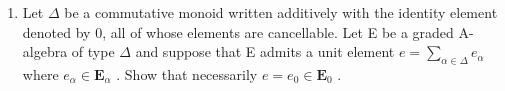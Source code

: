 \BourbakiExercisesSection

\begin{enumerate}
\def\labelenumi{\arabic{enumi}.}
\tightlist
\item
  Let \(\Delta\) be a commutative monoid written additively with the identity element denoted by 0, all of whose elements are cancellable. Let E be a graded A-algebra of type \(\Delta\) and suppose that E admits a unit element \(e = \sum_{\alpha \in \Delta} e_{\alpha}\) where \(e_{\alpha} \in \mathbf{E}_{\alpha}\) . Show that necessarily \(e = e_0 \in \mathbf{E}_0\) .
\end{enumerate}
\relax{}
